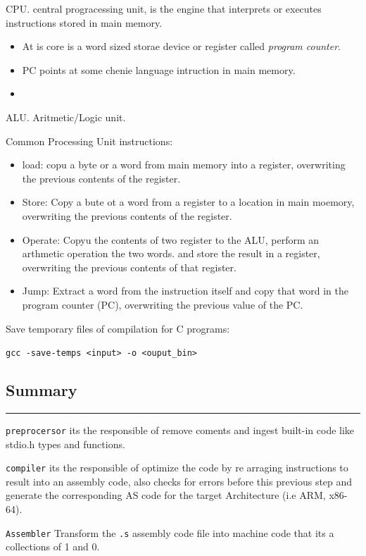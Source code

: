 \documentclass[11pt,a4paper]{report}
\begin{document}
CPU. central progracessing unit, is the engine that interprets or executes instructions stored in main memory.
\begin{itemize}
  \item At is core is a word sized storae device or register called \textit{program counter}.
  \item PC points at some chenie language intruction in main memory.
  \item 

\end{itemize}
ALU. Aritmetic/Logic unit.

Common Processing Unit instructions:
\begin{itemize}
  \item load: copu a byte or a word from main memory into a register, overwriting the previous contents of the register.
  \item Store: Copy a bute ot a word from a register to a location in main moemory, overwriting the previous contents of the register.
  \item Operate: Copyu the contents of two register to the ALU, perform an arthmetic operation the two words. and store the result in a register, overwriting the previous contents of that register.
  \item Jump: Extract a word from the instruction itself and copy that word in the program counter (PC), overwriting the previous value of the PC.


\end{itemize}
Save temporary files of compilation for C programs:

\texttt{gcc -save-temps \textless{}input\textgreater{} -o \textless{}ouput\_bin\textgreater{}}

\subsection{Summary}
\noindent\rule{\textwidth}{0.4pt}
\texttt{preprocersor} its the responsible of remove coments and ingest built-in code like stdio.h types and functions.

\texttt{compiler} its the responsible of optimize the code by re arraging instructions to result into an assembly code, also checks for errors before this previous step and generate the corresponding AS code for the target Architecture (i.e ARM, x86-64).

\texttt{Assembler} Transform the \texttt{.s} assembly code file into machine code that its a collections of 1 and 0.
\end{document}
